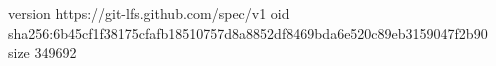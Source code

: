 version https://git-lfs.github.com/spec/v1
oid sha256:6b45cf1f38175cfafb18510757d8a8852df8469bda6e520c89eb3159047f2b90
size 349692
